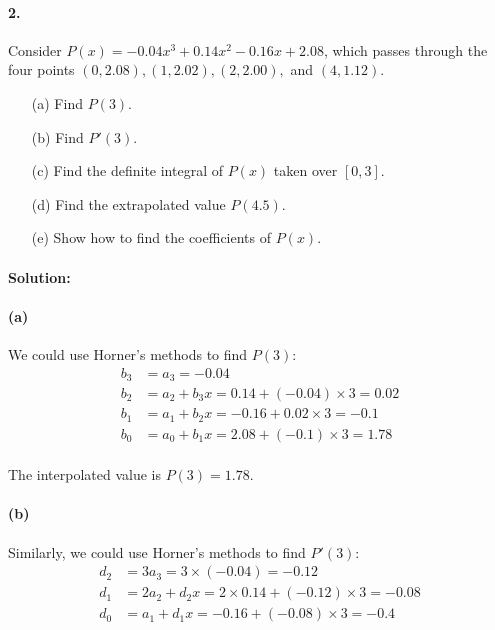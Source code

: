 \documentclass{article}  %
\begin{document}
        \paragraph{2.}Consider $P(x) = -0.04x^3 + 0.14x^2 - 0.16x + 2.08$, which passes through the four points $(0, 2.08), (1, 2.02), (2, 2.00),$ and $(4, 1.12)$.
        \begin{enumerate}
            \item[(a)]  Find $P(3)$.
            \item[(b)]  Find $P'(3)$.
            \item[(c)]  Find the definite integral of $P(x)$ taken over $[0, 3]$.
            \item[(d)]  Find the extrapolated value $P(4.5)$.
            \item[(e)]  Show how to find the coefficients of $P(x)$.
        \end{enumerate}
        \paragraph{Solution:}
        \paragraph{(a)}We could use Horner's methods to find $P(3)$:
        \begin{align*}
            b_3 &= a_3 = -0.04\\
            b_2 &= a_2 + b_3x = 0.14 + (-0.04) \times 3 = 0.02\\
            b_1 &= a_1 + b_2x = -0.16 + 0.02 \times 3 = -0.1\\
            b_0 &= a_0 + b_1x = 2.08 + (-0.1) \times 3 = 1.78
        \end{align*}
        \paragraph{}The interpolated value is $P(3) = 1.78$.
        \paragraph{(b)}Similarly, we could use Horner's methods to find $P'(3)$:
        \begin{align*}
            d_2 &= 3a_3 = 3 \times (-0.04) = -0.12\\
            d_1 &= 2a_2 + d_2x = 2 \times 0.14 + (-0.12) \times 3 = -0.08\\
            d_0 &= a_1 + d_1x = -0.16 + (-0.08) \times 3 = -0.4
        \end{align*}
\end{document}
